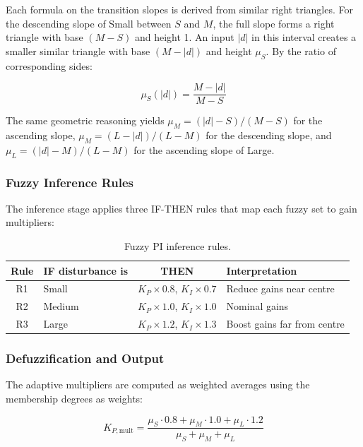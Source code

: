 Each formula on the transition slopes is derived from similar right triangles. For the descending slope of Small between $S$ and $M$, the full slope forms a right triangle with base $(M - S)$ and height 1. An input $|d|$ in this interval creates a smaller similar triangle with base $(M - |d|)$ and height $\mu_S$. By the ratio of corresponding sides:

\begin{equation}
    \mu_S(|d|) = \frac{M - |d|}{M - S}
    \label{eq:mu-small}
\end{equation}

The same geometric reasoning yields $\mu_M = (|d| - S)/(M - S)$ for the ascending slope, $\mu_M = (L - |d|)/(L - M)$ for the descending slope, and $\mu_L = (|d| - M)/(L - M)$ for the ascending slope of Large.

\subsubsection{Fuzzy Inference Rules}

The inference stage applies three IF-THEN rules that map each fuzzy set to gain multipliers:

\begin{table}[htbp]
\centering
\caption{Fuzzy PI inference rules.}
\label{tab:fuzzy-pi-rules}
\begin{tabular}{c l c l}
\hline
\textbf{Rule} & \textbf{IF disturbance is} & \textbf{THEN} & \textbf{Interpretation} \\
\hline
R1 & Small  & $K_P \times 0.8$,\; $K_I \times 0.7$ & Reduce gains near centre \\
R2 & Medium & $K_P \times 1.0$,\; $K_I \times 1.0$ & Nominal gains \\
R3 & Large  & $K_P \times 1.2$,\; $K_I \times 1.3$ & Boost gains far from centre \\
\hline
\end{tabular}
\end{table}

\subsubsection{Defuzzification and Output}

The adaptive multipliers are computed as weighted averages using the membership degrees as weights:

\begin{equation}
    K_{P,\text{mult}} = \frac{\mu_S \cdot 0.8 + \mu_M \cdot 1.0 + \mu_L \cdot 1.2}{\mu_S + \mu_M + \mu_L}
    \label{eq:kp-mult}
\end{equation}

